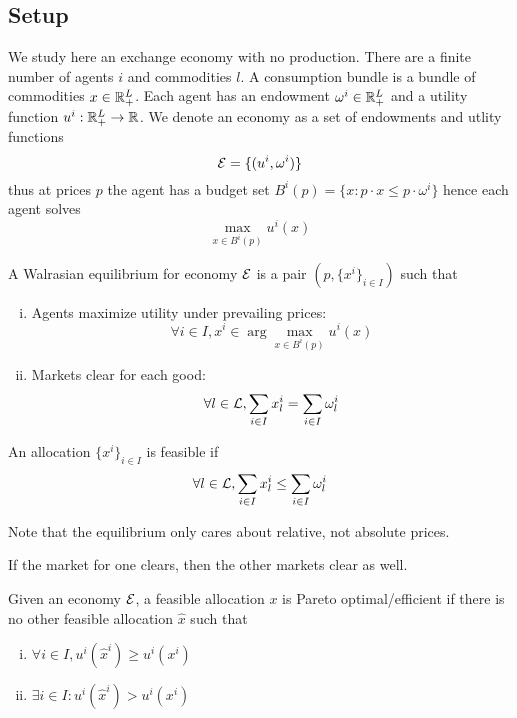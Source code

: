 




\subsection{Setup}

We study here an exchange economy with no production. There are a
finite number of agents $i$ and commodities $l$. A consumption bundle
is a bundle of commodities $x \in {\mathbb R}^L_+$. Each agent has an endowment
$\omega^i \in {\mathbb R}^L_+$ and a utility function $u^i : {\mathbb R}^L_+ \to {\mathbb R}$. We
denote an economy as a set of endowments and utlity functions
\[
{\cal E} = \{(u^i, \omega^i)\}
\]
thus at prices $p$ the agent has a budget set $B^i(p) = \{x : p \cdot
x \leq p \cdot \omega^i\}$ hence each agent solves
\[
\max_{x \in B^i(p)} u^i(x)
\]

\begin{definition}
  A Walrasian equilibrium for economy ${\cal E}$ is a pair $(p,
  \{x^i\}_{i \in I})$ such that
  \begin{enumerate}[(i)]
  \item Agents maximize utility under prevailing prices:
    \[
    \forall i \in I, x^i \in \arg \max_{x \in B^i(p)} u^i(x)
    \]
  \item Markets clear for each good:
    \[
    \forall l \in {\cal L}, \sum_{i \in I} x^i_l = \sum_{i \in I} \omega^i_l
    \]
  \end{enumerate}
\end{definition}

\begin{definition}
  An allocation $\{x^i\}_{i \in I}$ is feasible if
  \[
  \forall l \in {\cal L}, \sum_{i \in I} x^i_l \leq \sum_{i \in I} \omega^i_l
  \]
\end{definition}

Note that the equilibrium only cares about relative, not absolute
prices.

\begin{prop}
  If the market for one clears, then the other markets clear as well.
\end{prop}

\begin{definition}
  Given an economy ${\cal E}$, a feasible allocation $x$ is Pareto
  optimal/efficient if there is no other feasible allocation $\hat x$
  such that
  \begin{enumerate}[(i)]
  \item $\forall i \in I, u^i(\hat x^i) \geq u^i(x^i)$
  \item $\exists i \in I: u^i(\hat x^i) > u^i(x^i)$
  \end{enumerate}
\end{definition}

